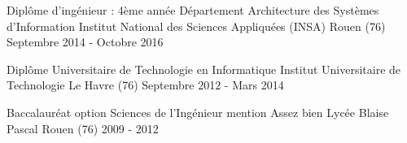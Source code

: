 

\begin{cventries}

  \cventryFour
    {Diplôme d'ingénieur : 4ème année Département Architecture des Systèmes d'Information} %
    {Institut National des Sciences Appliquées (INSA)} %
    {Rouen (76)} %
    {Septembre 2014 - Octobre 2016} %
    
    
  \cventryFour
	{Diplôme Universitaire de Technologie en Informatique} %
	{Institut Universitaire de Technologie} %
	{Le Havre (76)} %
	{Septembre 2012 - Mars 2014} %
	{}
	
  \cventryFour
	{Baccalauréat option Sciences de l'Ingénieur mention Assez bien} %
	{Lycée Blaise Pascal} %
	{Rouen (76)} %
	{2009 - 2012} %
	{}
	
	
\end{cventries}
